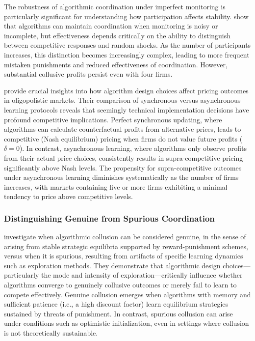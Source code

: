The robustness of algorithmic coordination under imperfect monitoring is particularly significant for understanding how participation affects stability. \textcite{calvano_algorithmic_2021} show that algorithms can maintain coordination when monitoring is noisy or incomplete, but effectiveness depends critically on the ability to distinguish between competitive responses and random shocks. As the number of participants increases, this distinction becomes increasingly complex, leading to more frequent mistaken punishments and reduced effectiveness of coordination. However, substantial collusive profits persist even with four firms.

\textcite{asker_artificial_2022, asker_impact_2024} provide crucial insights into how algorithm design choices affect pricing outcomes in oligopolistic markets. Their comparison of synchronous versus asynchronous learning protocols reveals that seemingly technical implementation decisions have profound competitive implications. Perfect synchronous updating, where algorithms can calculate counterfactual profits from alternative prices, leads to competitive (Nash equilibrium) pricing when firms do not value future profits ($\delta = 0$). In contrast, asynchronous learning, where algorithms only observe profits from their actual price choices, consistently results in supra-competitive pricing significantly above Nash levels. The propensity for supra-competitive outcomes under asynchronous learning diminishes systematically as the number of firms increases, with markets containing five or more firms exhibiting a minimal tendency to price above competitive levels.

\subsubsection*{Distinguishing Genuine from Spurious Coordination}

\textcite{calvano_algorithmic_2023} investigate when algorithmic collusion can be considered genuine, in the sense of arising from stable strategic equilibria supported by reward-punishment schemes, versus when it is spurious, resulting from artifacts of specific learning dynamics such as exploration methods. They demonstrate that algorithmic design choices—particularly the mode and intensity of exploration—critically influence whether algorithms converge to genuinely collusive outcomes or merely fail to learn to compete effectively. Genuine collusion emerges when algorithms with memory and sufficient patience (i.e., a high discount factor) learn equilibrium strategies sustained by threats of punishment. In contrast, spurious collusion can arise under conditions such as optimistic initialization, even in settings where collusion is not theoretically sustainable.


